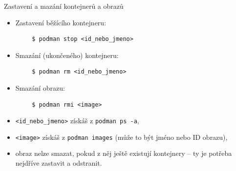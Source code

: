 \documentclass{beamer}
\begin{document}
\begin{frame}[fragile]{Zastavení a mazání kontejnerů a obrazů}
	\begin{itemize}
		\item Zastavení běžícího kontejneru:
	\end{itemize}
	\begin{verbatim}
		$ podman stop <id_nebo_jmeno>
	\end{verbatim}
	
	\begin{itemize}
		\item Smazání (ukončeného) kontejneru:
	\end{itemize}
	\begin{verbatim}
		$ podman rm <id_nebo_jmeno>
	\end{verbatim}
	
	\begin{itemize}
		\item Smazání obrazu:
	\end{itemize}
	\begin{verbatim}
		$ podman rmi <image>
	\end{verbatim}
	
	\begin{itemize}
		\item \texttt{<id\_nebo\_jmeno>} získáš z \texttt{podman ps -a},
		\item \texttt{<image>} získáš z \texttt{podman images}
		(může to být jméno nebo ID obrazu),
		\item obraz nelze smazat, pokud z něj ještě existují kontejnery –
		ty je potřeba nejdříve zastavit a odstranit.
	\end{itemize}
\end{frame}
\end{document}

